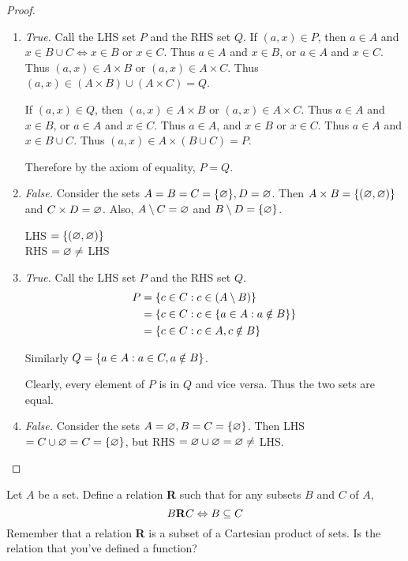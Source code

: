 \documentclass[12pt]{article}
\begin{document}
\begin{proof}
    \begin{enumerate}[label=(\alph*)]
        \item \emph{True.}
        Call the LHS set $P$ and the RHS set $Q$.
        If $(a, x) \in P$, then $a \in A$ and $x \in B \cup C \iff x \in B$ or $x \in C$.
        Thus $a \in A$ and $x \in B$, or $a \in A$ and $x \in C$.
        Thus $(a, x) \in A \times B$ or $(a, x) \in A \times C$.
        Thus $(a, x) \in (A \times B) \cup (A \times C) = Q$.

        If $(a, x) \in Q$, then $(a, x) \in A \times B$ or $(a, x) \in A \times C$.
        Thus $a \in A$ and $x \in B$, or $a \in A$ and $x \in C$.
        Thus $a \in A$, and $x \in B$ or $x \in C$.
        Thus $a \in A$ and $x \in B \cup C$.
        Thus $(a, x) \in A \times (B \cup C) = P$.

        Therefore by the axiom of equality, $P = Q$.

        \item \emph{False.}
        Consider the sets $A = B = C = \set{\O}, D = \O$.
        Then $A \times B = \set{(\O, \O)}$ and $C \times D = \O$.
        Also, $A \setminus C = \O$ and $B \setminus D = \set{\O}$.

        LHS $= \set{(\O, \O)}$ \\
        RHS $= \O \neq$ LHS

        \item \emph{True.}
        Call the LHS set $P$ and the RHS set $Q$.
        \begin{align*}
            P &= \set{c \in C : c \in (A \setminus B)} \\
            &= \set{c \in C : c \in \{a \in A : a \notin B} \} \\
            &= \set{c \in C : c \in A, c \notin B}
        \end{align*}

        Similarly $Q = \set{a \in A : a \in C, a \notin B}$.

        Clearly, every element of $P$ is in $Q$ and vice versa. Thus the two sets are equal.

        \item \emph{False.} Consider the sets $A = \O, B = C = \set{\O}$. Then LHS $= C \cup \O = C = \set{\O}$, but RHS $= \O \cup \O = \O \neq$ LHS. \qedhere
    \end{enumerate}
\end{proof}

\begin{problem}
    Let $A$ be a set. Define a relation \textbf{R} such that for any subsets $B$ and $C$ of $A$,
    \[
        B \text{\textbf{R}} C \iff B \subseteq C
    \]
    Remember that a relation \textbf{R} is a subset of a Cartesian product of sets.
    Is the relation that you’ve defined a function?
\end{problem}
\end{document}
